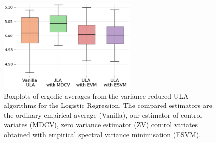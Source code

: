 \documentclass[bj]{imsart}
\begin{document}
\begin{figure}[h]
\begin{center}
\includegraphics[width=0.6\textwidth]{../pictures/logreg_1st_order.png}
\caption{Boxplots of ergodic averages  from the variance reduced ULA algorithms for the Logistic Regression. The compared estimators are the ordinary empirical average (Vanilla), our estimator of control variates (MDCV), zero variance estimator (ZV) control variates obtained with empirical spectral variance minimisation (ESVM).
 \label{fig:2}}
\end{center}
\end{figure}
\end{document}
